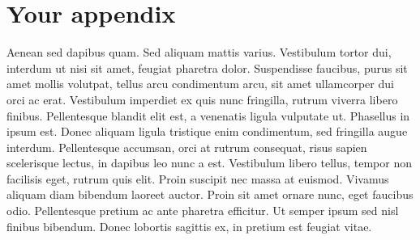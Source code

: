 \documentclass[12pt, twoside]{report}
\begin{document}
  


\appendix
\chapter{Your appendix}\label{apx:morestuff}
Aenean sed dapibus quam. 
Sed aliquam mattis varius. 
Vestibulum tortor dui, interdum ut nisi sit amet, feugiat pharetra dolor. 
Suspendisse faucibus, purus sit amet mollis volutpat, tellus arcu condimentum arcu, sit amet ullamcorper dui orci ac erat. 
Vestibulum imperdiet ex quis nunc fringilla, rutrum viverra libero finibus. 
Pellentesque blandit elit est, a venenatis ligula vulputate ut. 
Phasellus in ipsum est. Donec aliquam ligula tristique enim condimentum, sed fringilla augue interdum. 
Pellentesque accumsan, orci at rutrum consequat, risus sapien scelerisque lectus, in dapibus leo nunc a est. Vestibulum libero tellus, tempor non facilisis eget, rutrum quis elit.
Proin suscipit nec massa at euismod. Vivamus aliquam diam bibendum laoreet auctor.
Proin sit amet ornare nunc, eget faucibus odio. 
Pellentesque pretium ac ante pharetra efficitur. 
Ut semper ipsum sed nisl finibus bibendum. Donec lobortis sagittis ex, in pretium est feugiat vitae. 
\end{document}
